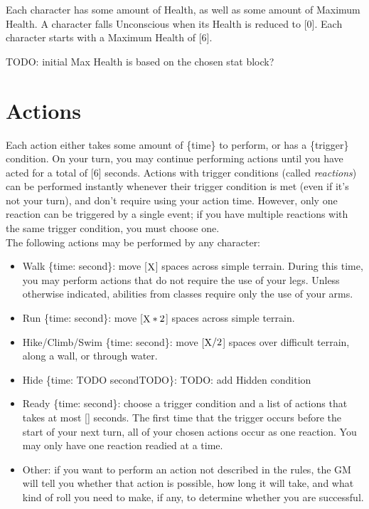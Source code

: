 \documentclass[12pt]{article}
\newcommand{\X}{\text{{\lower 0.2mm \hbox{X}}}}
\newcommand{\TIME}[1]{\{time: #1 second\if1#1{}\else{s}\fi\}}
\begin{document}
Each character has some amount of Health, as well as some amount of Maximum Health. A character falls Unconscious when its Health is reduced to [0]. Each character starts with a Maximum Health of [6].

TODO: initial Max Health is based on the chosen stat block?

\pagebreak
\section{Actions}

Each action either takes some amount of \{time\} to perform, or has a \{trigger\} condition. On your turn, you may continue performing actions until you have acted for a total of [6] seconds. Actions with trigger conditions (called \textit{reactions}) can be performed instantly whenever their trigger condition is met (even if it’s not your turn), and don’t require using your action time. However, only one reaction can be triggered by a single event; if you have multiple reactions with the same trigger condition, you must choose one.
\\[5mm]
The following actions may be performed by any character:
\begin{itemize}

\item Walk \TIME{\X}: move [$\X$] spaces across simple terrain. During this time, you may perform actions that do not require the use of your legs. Unless otherwise indicated, abilities from classes require only the use of your arms.

\item Run \TIME{\X}: move [$\X * 2$] spaces across simple terrain.

\item Hike/Climb/Swim \TIME{\X}: move [$\X / 2$] spaces over difficult terrain, along a wall, or through water.

\item Hide \TIME{TODO}: TODO: add Hidden condition

\item Ready \TIME{\X}: choose a trigger condition and a list of actions that takes at most [\X] seconds. The first time that the trigger occurs before the start of your next turn, all of your chosen actions occur as one reaction. You may only have one reaction readied at a time.

\item Other: if you want to perform an action not described in the rules, the GM will tell you whether that action is possible, how long it will take, and what kind of roll you need to make, if any, to determine whether you are successful.

\end{itemize}
\end{document}
